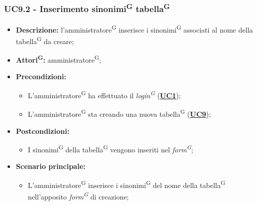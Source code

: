 \subsubsection{UC9.2 - Inserimento sinonimi\textsuperscript{G} tabella\textsuperscript{G}}
\label{sec:UC9.2}
\begin{itemize}
	\item \textbf{Descrizione:} l’amministratore\textsuperscript{G} inserisce i sinonimi\textsuperscript{G} associati al nome della tabella\textsuperscript{G} da creare;
	\item \textbf{Attori\textsuperscript{G}:} amministratore\textsuperscript{G};
	\item \textbf{Precondizioni:} 
	\begin{itemize}
		\item L’amministratore\textsuperscript{G} ha effettuato il \textit{login\textsuperscript{G}} (\hyperref[sec:UC1]{\textbf{UC1}});
		\item L’amministratore\textsuperscript{G} sta creando una nuova tabella\textsuperscript{G} (\hyperref[sec:UC9]{\textbf{UC9}});
	\end{itemize}
	\item \textbf{Postcondizioni:} 
	\begin{itemize}
		\item I sinonimi\textsuperscript{G} della tabella\textsuperscript{G} vengono inseriti nel \textit{form\textsuperscript{G}};
	\end{itemize}
	\item \textbf{Scenario principale:} 
	\begin{itemize}
		\item L’amministratore\textsuperscript{G} inserisce i sinonimi\textsuperscript{G} del nome della tabella\textsuperscript{G} nell'apposito \textit{form\textsuperscript{G}} di creazione;
	\end{itemize}
\end{itemize}

